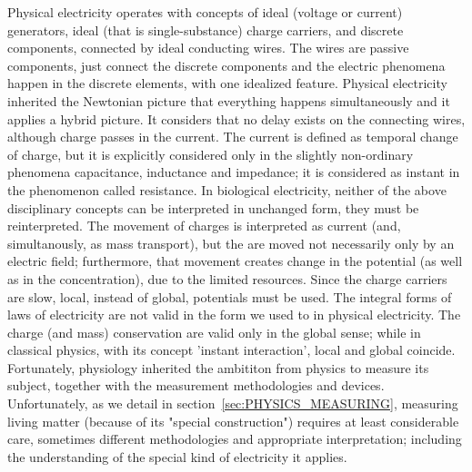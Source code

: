 Physical electricity operates with concepts of ideal (voltage or current) generators, ideal (that is single-substance) charge carriers, and discrete components, connected by ideal conducting wires.
The wires are passive components, just connect
the discrete components and the electric phenomena happen in the 
discrete elements, with one idealized feature.
Physical electricity inherited the Newtonian picture that everything happens simultaneously and it applies a hybrid picture.
It considers that no delay exists on the connecting wires, although charge passes in the current.  
The current is defined as temporal change of charge,
but it is explicitly considered only in the slightly non-ordinary 
phenomena capacitance, inductance and impedance; it is considered
as instant in the phenomenon called resistance.
In biological electricity, neither of the above  disciplinary concepts
can be interpreted in unchanged form, they must be reinterpreted. The movement of charges is interpreted as current (and, simultanously, as mass transport),
but the are moved not necessarily only by an electric field;
furthermore,
that movement creates change in the potential (as well as in the concentration), due to the limited resources.
Since the charge carriers are slow,
local, instead of global, potentials must be used. 
The integral forms of laws of electricity are not valid in the form
we used to in physical electricity. The charge (and mass) conservation
are valid only in the global sense; while in classical physics, with its concept 'instant interaction', local and global coincide.
%
Fortunately, physiology inherited the ambititon from physics to measure its subject, together with the measurement methodologies and devices. Unfortunately,
as we detail in section~\ref{sec:PHYSICS_MEASURING}, measuring living matter (because of its "special construction") requires at least considerable care,
sometimes different methodologies and appropriate interpretation; including the understanding of the special kind of electricity it applies.

